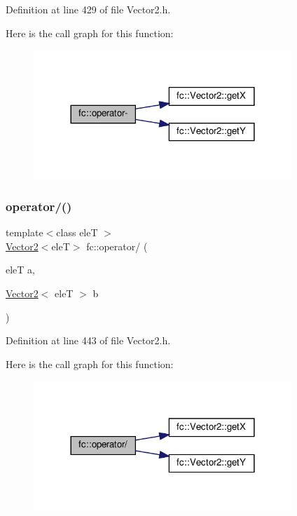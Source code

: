 Definition at line 429 of file Vector2.\+h.

Here is the call graph for this function\+:
\nopagebreak
\begin{figure}[H]
\begin{center}
\leavevmode
\includegraphics[width=276pt]{d2/db4/namespacefc_a851bc28427c29f20a4433485c0ae7afd_cgraph}
\end{center}
\end{figure}
\mbox{\label{namespacefc_a639753beb1103357bce89497028a1443}} 
\subsubsection{\texorpdfstring{operator/()}{operator/()}}
{\footnotesize\ttfamily template$<$class eleT $>$ \\
\hyperlink{classfc_1_1Vector2}{Vector2}$<$eleT$>$ fc\+::operator/ (\begin{DoxyParamCaption}\item[{eleT}]{a,  }\item[{\hyperlink{classfc_1_1Vector2}{Vector2}$<$ eleT $>$}]{b }\end{DoxyParamCaption})}



Definition at line 443 of file Vector2.\+h.

Here is the call graph for this function\+:
\nopagebreak
\begin{figure}[H]
\begin{center}
\leavevmode
\includegraphics[width=276pt]{d2/db4/namespacefc_a639753beb1103357bce89497028a1443_cgraph}
\end{center}
\end{figure}
\mbox{\label{namespacefc_a032cdf3cc33e52b02c4b66f65fc532b2}} 
